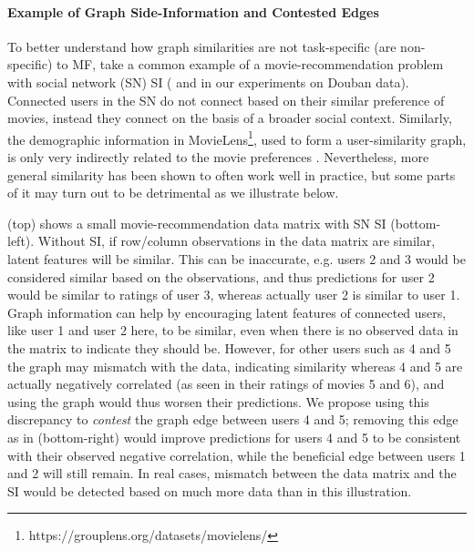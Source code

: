 \documentclass{article}
\theoremstyle{plain}
\theoremstyle{definition}
\theoremstyle{remark}
\begin{document}
\paragraph{Example of Graph Side-Information and Contested Edges}
To better understand how graph similarities are not task-specific (are non-specific) to MF, take a common example of a movie-recommendation problem with social network (SN) SI (\citet{ma2011recommender} and in our experiments on Douban data). Connected users in the SN do not connect based on their similar preference of movies, instead they connect on the basis of a broader social context.
Similarly, the demographic information in MovieLens\footnote{https://grouplens.org/datasets/movielens/}, used to form a user-similarity graph, is only very indirectly related to the movie preferences \cite{mcpherson2001birds}. Nevertheless, more general similarity has been shown to often work well in practice, but some parts of it may turn out to be detrimental as we illustrate below.
 
 (top) 
shows a small movie-recommendation data matrix with SN SI (bottom-left).  Without SI, if row/column observations in the data matrix are similar, latent features will be similar. This can be inaccurate, e.g. users 2 and 3 would be considered similar based on the observations, and thus predictions for user 2 would be similar to ratings of user 3, whereas actually user 2 is similar to user 1. Graph information can help by encouraging latent features of connected users, like user 1 and user 2 here, to be similar, even when there is no observed data in the matrix to indicate they should be. However, for other users such as 4 and 5 the graph may mismatch with the data, indicating similarity whereas 4 and 5 are actually negatively correlated (as seen in their ratings of movies 5 and 6), and using the graph would thus worsen their predictions. We propose using this discrepancy to \textit{contest} the graph edge between users 4 and 5; removing this edge as in  (bottom-right) would improve predictions for users 4 and 5 to be consistent with their observed negative correlation, while the beneficial edge between users 1 and 2 will still remain. In real cases, mismatch between the data matrix and the SI would be detected based on much more data than in this illustration.
\end{document}
